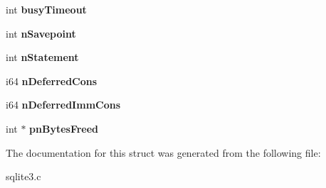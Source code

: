 \begin{DoxyCompactItemize}
\item 
int {\bfseries busy\+Timeout}\hypertarget{structsqlite3_a69237f7a2b079706c544f09255fd8905}{}\label{structsqlite3_a69237f7a2b079706c544f09255fd8905}

\item 
int {\bfseries n\+Savepoint}\hypertarget{structsqlite3_a51d1dc4f5668dbc2282162bdfdca96ec}{}\label{structsqlite3_a51d1dc4f5668dbc2282162bdfdca96ec}

\item 
int {\bfseries n\+Statement}\hypertarget{structsqlite3_a727c6da42aa4313c715de350303c90f6}{}\label{structsqlite3_a727c6da42aa4313c715de350303c90f6}

\item 
i64 {\bfseries n\+Deferred\+Cons}\hypertarget{structsqlite3_a1d74627daa6fe93811e99cffe9362c10}{}\label{structsqlite3_a1d74627daa6fe93811e99cffe9362c10}

\item 
i64 {\bfseries n\+Deferred\+Imm\+Cons}\hypertarget{structsqlite3_a784716abd1e79a084257ad5c6da7ebb5}{}\label{structsqlite3_a784716abd1e79a084257ad5c6da7ebb5}

\item 
int $\ast$ {\bfseries pn\+Bytes\+Freed}\hypertarget{structsqlite3_a5559fb199b06ee59b635bb18f153fcf8}{}\label{structsqlite3_a5559fb199b06ee59b635bb18f153fcf8}

\end{DoxyCompactItemize}


The documentation for this struct was generated from the following file\+:\begin{DoxyCompactItemize}
\item 
sqlite3.\+c\end{DoxyCompactItemize}
